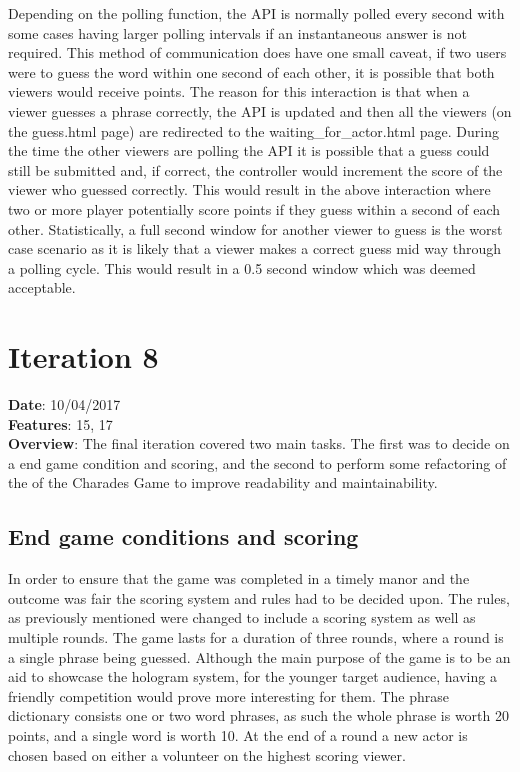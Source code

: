 Depending on the polling function, the API is normally polled every second with some cases having larger polling intervals if  an instantaneous answer is not required. This method of communication does have one small caveat, if two users were to guess the word within one second of each other, it is possible that both viewers would receive points. The reason for this interaction is that when a viewer guesses a phrase correctly, the API is updated and then all the viewers (on the guess.html page) are redirected to the waiting\_for\_actor.html page. During the time the other viewers are polling the API it is possible that a guess could still be submitted and, if correct, the controller would increment the score of the viewer who guessed correctly. This would result in the above interaction where two or more player potentially score points if they guess within a second of each other. Statistically, a full second window for another viewer to guess is the worst case scenario as it is likely that a viewer makes a correct guess mid way through a polling cycle. This would result in a 0.5 second window which was deemed acceptable.

\newpage

\section{Iteration 8}
\textbf{Date}: 10/04/2017 \\
\textbf{Features}: 15, 17 \\
\textbf{Overview}: The final iteration covered two main tasks. The first was to decide on a end game condition and scoring, and the second to perform some refactoring of the of the Charades Game to improve readability and maintainability.

\subsection{End game conditions and scoring}
In order to ensure that the game was completed in a timely manor and the outcome was fair the scoring system and rules had to be decided upon. The rules, as previously mentioned were changed to include a scoring system as well as multiple rounds. The game lasts for a duration of three rounds, where a round is a single phrase being guessed. Although the main purpose of the game is to be an aid to showcase the hologram system, for the younger target audience, having a friendly competition would prove more interesting for them. The phrase dictionary consists one or two word phrases, as such the whole phrase is worth 20 points, and a single word is worth 10. At the end of a round a new actor is chosen based on either a volunteer on the highest scoring viewer.

